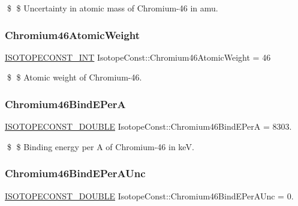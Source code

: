 \$ \$ Uncertainty in atomic mass of Chromium-\/46 in amu. \mbox{\label{group___isotope_const-_chromium-_cr46_ga1159154e3f98089bef39c98c4f4e4376}} 
\subsubsection{\texorpdfstring{Chromium46\+Atomic\+Weight}{Chromium46AtomicWeight}}
{\footnotesize\ttfamily \mbox{\hyperlink{group___isotope_const-_macros_ga5f18360b3e99483a35c32d789e62621c}{I\+S\+O\+T\+O\+P\+E\+C\+O\+N\+S\+T\+\_\+\+I\+NT}} Isotope\+Const\+::\+Chromium46\+Atomic\+Weight = 46}

\$ \$ Atomic weight of Chromium-\/46. \mbox{\label{group___isotope_const-_chromium-_cr46_ga2101f5c5b963d6459bfc0642289d3401}} 
\subsubsection{\texorpdfstring{Chromium46\+Bind\+E\+PerA}{Chromium46BindEPerA}}
{\footnotesize\ttfamily \mbox{\hyperlink{group___isotope_const-_macros_ga8f45a7272ce02c0b4c65c44636ed719a}{I\+S\+O\+T\+O\+P\+E\+C\+O\+N\+S\+T\+\_\+\+D\+O\+U\+B\+LE}} Isotope\+Const\+::\+Chromium46\+Bind\+E\+PerA = 8303.}

\$ \$ Binding energy per A of Chromium-\/46 in keV. \mbox{\label{group___isotope_const-_chromium-_cr46_ga6a7977fd26fb92592d80d3afcd637f50}} 
\subsubsection{\texorpdfstring{Chromium46\+Bind\+E\+Per\+A\+Unc}{Chromium46BindEPerAUnc}}
{\footnotesize\ttfamily \mbox{\hyperlink{group___isotope_const-_macros_ga8f45a7272ce02c0b4c65c44636ed719a}{I\+S\+O\+T\+O\+P\+E\+C\+O\+N\+S\+T\+\_\+\+D\+O\+U\+B\+LE}} Isotope\+Const\+::\+Chromium46\+Bind\+E\+Per\+A\+Unc = 0.}

